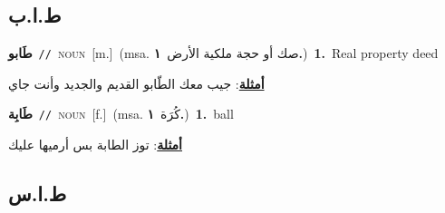 \documentclass[10pt,a4paper,twoside]{article} %
\begin{document}
\begin{multicols}{2}
{\vspace{-3mm}
\subsection*{\color{blue}\foreignlanguage{arabic}{ط.ا.ب}\color{blue}{ (ntws)}} 

{\setlength\topsep{0pt}\textbf{\foreignlanguage{arabic}{طَابو}}\ {\color{gray}\texttt{//}\color{black}}\ \textsc{noun}\ [m.]\ \color{gray}(msa. \foreignlanguage{arabic}{صك أو حجة ملكية الأرض}~\foreignlanguage{arabic}{\textbf{١.}})\color{black}\ \textbf{1.}~Real property deed\  \begin{flushright}\color{gray}\foreignlanguage{arabic}{\textbf{\underline{\foreignlanguage{arabic}{أمثلة}}}: جيب معك الطّابو القديم والجديد وأنت جاي}\end{flushright}\color{black}} \vspace{2mm}

{\setlength\topsep{0pt}\textbf{\foreignlanguage{arabic}{طَابِة}}\ {\color{gray}\texttt{//}\color{black}}\ \textsc{noun}\ [f.]\ \color{gray}(msa. \foreignlanguage{arabic}{كُرَة}~\foreignlanguage{arabic}{\textbf{١.}})\color{black}\ \textbf{1.}~ball\  \begin{flushright}\color{gray}\foreignlanguage{arabic}{\textbf{\underline{\foreignlanguage{arabic}{أمثلة}}}: توز الطابة بس أرميها عليك}\end{flushright}\color{black}} \vspace{2mm}

\vspace{-3mm}
\subsection*{\color{blue}\foreignlanguage{arabic}{ط.ا.س}\color{blue}{ (ntws)}} 

}
\end{multicols}
\end{document}
